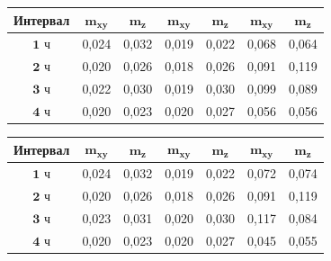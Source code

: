 \begin{table} [htbp]
	\centering\small
	\begin{threeparttable}%
		\label{tab:tab56}
		\setlength{\tabcolsep}{5pt}
		
		\begin{tabular}{ c
				S[table-number-alignment = center]
				S[table-number-alignment = center]
				S[table-number-alignment = center]
				S[table-number-alignment = center]
				S[table-number-alignment = center]
				S[table-number-alignment = center] }
			
		\toprule
		\textbf{Интервал}	& $\mathbf{m_{xy}}$& $\mathbf{m_{z}}$& $\mathbf{m_{xy}}$& $\mathbf{m_{z}}$	& $\mathbf{m_{xy}}$	& $\mathbf{m_{z}}$	\\ \midrule%
		$\mathbf{1}$ ч	&  0,024	&  0,032	&  0,019	&	0,022	&	0,068	&	0,064		\\ 
		$\mathbf{2}$ ч	&  0,020	&  0,026	&  0,018	&	0,026	&	0,091	&	0,119		\\ 
		$\mathbf{3}$ ч	&  0,022	&  0,030	&  0,019	&	0,030	&	0,099	&	0,089		\\ 
		$\mathbf{4}$ ч	&  0,020	&  0,023	&  0,020	&	0,027	&	0,056	&	0,056		\\ 
		\bottomrule
		\end{tabular}

	\qquad%

		\begin{tabular}{ c
		S[table-number-alignment = center]
		S[table-number-alignment = center]
		S[table-number-alignment = center]
		S[table-number-alignment = center]
		S[table-number-alignment = center]
		S[table-number-alignment = center] }
	
		\toprule
		\textbf{Интервал}	& $\mathbf{m_{xy}}$& $\mathbf{m_{z}}$& $\mathbf{m_{xy}}$& $\mathbf{m_{z}}$	& $\mathbf{m_{xy}}$	& $\mathbf{m_{z}}$	\\ \midrule%
		$\mathbf{1}$ ч	&  0,024	&  0,032	&  0,019	&	0,022	&	0,072	&	0,074		\\ 
		$\mathbf{2}$ ч	&  0,020	&  0,026	&  0,018	&	0,026	&	0,091	&	0,119		\\ 
		$\mathbf{3}$ ч	&  0,023	&  0,031	&  0,020	&	0,030	&	0,117	&	0,084		\\ 
		$\mathbf{4}$ ч	&  0,020	&  0,023	&  0,020	&	0,027	&	0,045	&	0,055		\\ 
		\bottomrule
		\end{tabular}

		
	\end{threeparttable}
\end{table}

